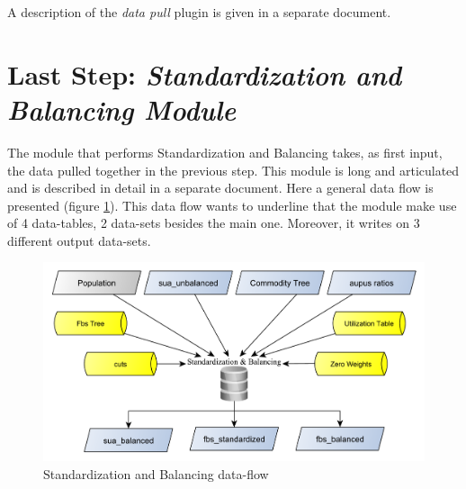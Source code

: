 \documentclass[]{article}
\begin{document}
A description of the \emph{data pull} plugin is given in a separate
document.

\section{\texorpdfstring{Last Step: \emph{Standardization and Balancing
Module}}{Last Step: Standardization and Balancing Module}}\label{last-step-standardization-and-balancing-module}

The module that performs Standardization and Balancing takes, as first
input, the data pulled together in the previous step. This module is
long and articulated and is described in detail in a separate document.
Here a general data flow is presented (figure \ref{fig:f18}). This data
flow wants to underline that the module make use of 4 data-tables, 2
data-sets besides the main one. Moreover, it writes on 3 different
output data-sets.

\begin{figure}[H]

{\centering \includegraphics[width=0.8\linewidth]{images/SwsFbs/18_standBAl} 

}

\caption{\label{fig:f18}Standardization and Balancing data-flow}\label{fig:f18}
\end{figure}
\end{document}
